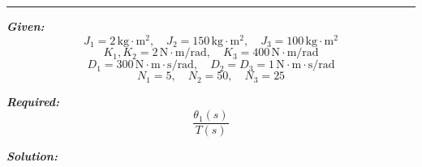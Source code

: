 \documentclass[11pt]{article}
\begin{document}
\noindent\rule{\textwidth}{1pt}

\vspace{12pt}


\noindent\textbf{\textit{Given:}}
\[
J_1 = 2\,\text{kg} \cdot \text{m}^2, \quad J_2 = 150\,\text{kg} \cdot \text{m}^2, \quad J_3 = 100\,\text{kg} \cdot \text{m}^2
\]
\[
K_1,K_2 = 2\,\text{N} \cdot \text{m/rad}, \quad K_3 = 400\,\text{N} \cdot \text{m/rad}
\]
\[
D_1 = 300\,\text{N} \cdot \text{m} \cdot \text{s/rad}, \quad D_2 = D_3 = 1\,\text{N} \cdot \text{m} \cdot \text{s/rad}
\]
\[
N_1 = 5, \quad N_2 = 50, \quad N_3 = 25
\]



\vspace{1em}
\noindent

\noindent\textbf{\textit{Required:}}
\[
\frac{\theta_1(s)}{T(s)}
\]

\vspace{1.5em}
\noindent\textbf{\textit{Solution:}}

\vspace{8pt}
\end{document}
